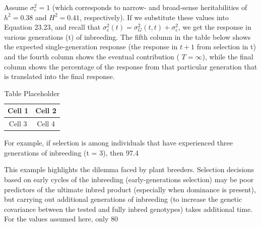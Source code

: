 \documentclass{article}
\begin{document}
Assume  $ \sigma_e^2 = 1 $ (which corresponds to narrow- and broad-sense heritabilities of  $ h^2 = 0.38 $ and  $ H^2 = 0.41 $, respectively). If we substitute these values into Equation 23.23, and recall that  $ \sigma_e^2(t) = \sigma_G^2(t, t) + \sigma_e^2 $, we get the response in various generations (t) of inbreeding. The fifth column in the table below shows the expected single-generation response (the response in  $ t + 1 $ from selection in t) and the fourth column shows the eventual contribution ( $ T = \infty $), while the final column shows the percentage of the response from that particular generation that is translated into the final response.

\begin{table}[h]
\centering
\begin{tabular}{|c|c|}
\hline
Cell 1 & Cell 2 \\
\hline
Cell 3 & Cell 4 \\
\hline
\end{tabular}
\caption{Table Placeholder}
\end{table}

For example, if selection is among individuals that have experienced three generations of inbreeding (t = 3), then 97.4%

This example highlights the dilemma faced by plant breeders. Selection decisions based on early cycles of the inbreeding (early-generations selection) may be poor predictors of the ultimate inbred product (especially when dominance is present), but carrying out additional generations of inbreeding (to increase the genetic covariance between the tested and fully inbred genotypes) takes additional time. For the values assumed here, only 80%
\end{document}
